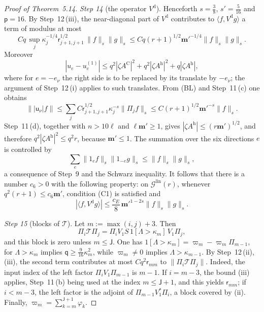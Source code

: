 \documentclass[11pt]{amsart}
\theoremstyle{definition}
\begin{document}
\begin{proof}[Proof of Theorem~5.14]
\emph{Step 14} (the operator $V^{\mathrm d}$).
Henceforth $s=\frac38$, $s'=\frac5{16}$ and $\mathsf p=16$.
By Step~12\,(iii), the near-diagonal part of $V^{\mathrm d}$ contributes to $\langle f,V^{\mathrm d}g\rangle$ a term of modulus at most
\begin{equation*}
Cq\,\sup_j\kappa_j^{-1/4}\mathsf r_{j+1,j+1}^{1/2}\,\|f\|_s\|g\|_s\le Cq(r+1)^{1/2}\mathbf m'^{-1/4}\|f\|_s\|g\|_s.
\end{equation*}
Moreover
\begin{equation*}
|u_e-u_e^{(1)}|\le q^2|\zeta A^{\mathrm C}|^2+q^2|\zeta A^{\mathrm h}|^2+q|\zeta A^{\mathrm h}|,
\end{equation*}
where for $e=-e_\nu$ the right side is to be replaced by its translate by $-e_\nu$; the argument of Step~12\,(i) applies to such translates.
From (BL) and Step~11\,(c) one obtains
\begin{equation*}
\bigl\||\mathsf u_\nu|f\bigr\|\le\sum_jC\mathsf r_{j+1,j+1}^{1/2}\kappa_j^{-s}\|\Pi_jf\|_s\le C(r+1)^{1/2}\mathbf m'^{-s}\|f\|_s.
\end{equation*}
Step~11\,(d), together with $n>10\ell$ and $\ell\mathbf m'\ge1$, gives $|\zeta A^{\mathrm h}|\le(r\mathbf m')^{1/2}$, and therefore $q^2|\zeta A^{\mathrm h}|^2\le q^2r$, because $\mathbf m'\le1$.
The summation over the six directions $e$ is controlled by
\begin{equation*}
\sum_e\|1_ef\|_s\|1_{-e}g\|_s\le\|f\|_s\|g\|_s,
\end{equation*}
a consequence of Step~9 and the Schwarz inequality.
It follows that there is a number $c_6>0$ with the following property: on $\mathcal G^{\mathrm{lin}}(r)$, whenever $q^2(r+1)\le c_6\mathbf m'$, condition (C1) is satisfied and
\begin{equation*}
|\langle f,V^{\mathrm d}g\rangle|\le\frac{c_E}{8}\,\mathbf m'^{1-2s}\|f\|_s\|g\|_s.
\end{equation*}

\emph{Step 15} (blocks of $\mathcal T$).
Let $m:=\max(i,j)+3$.
Then
\begin{equation*}
\Pi_i\mathcal T\Pi_j=\Pi_iV_1S\,1[\Lambda>\kappa_m]\,V_1\Pi_j,
\end{equation*}
and this block is zero unless $m\le\mathsf J$.
One has $1[\Lambda>\kappa_m]=\varpi_m-\varpi_m\Pi_{m-1}$, for $\Lambda>\kappa_m$ implies $\mathsf q\ge\frac9{16}\kappa_m^2$, while $\varpi_m\ne0$ implies $\Lambda>\kappa_{m-1}$.
By Step~12\,(ii), (iii), the second term contributes at most $Cq^2\mathsf r_{mm}$ to $\|\Pi_i\mathcal T\Pi_j\|$.
Indeed, the input index of the left factor $\Pi_iV_1\Pi_{m-1}$ is $m-1$.
If $i=m-3$, the bound (iii) applies, Step~11\,(b) being used at the index $m\le\mathsf J+1$, and this yields $\mathsf r_{mm}$; if $i<m-3$, the left factor is the adjoint of $\Pi_{m-1}V_1^*\Pi_i$, a block covered by (ii).
Finally, $\varpi_m=\sum_{k=m}^{\mathsf J+1}\varphi_k$.


\end{proof}
\end{document}
